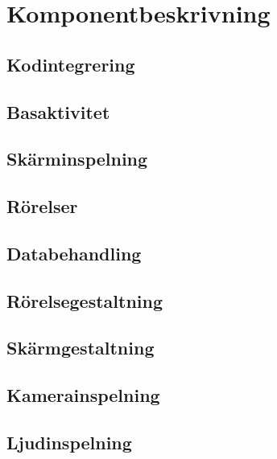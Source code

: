 \section{Komponentbeskrivning}

\subsection{Kodintegrering} %
\label{sub:Kodintegrering}


\subsection{Basaktivitet}


\subsection{Skärminspelning}


\subsection{Rörelser}


\subsection{Databehandling}
\label{sub:dataprocessing}


\subsection{Rörelsegestaltning}
\label{sub:touchmedia}


\subsection{Skärmgestaltning}
\label{sub:screenmedia}


\subsection{Kamerainspelning}


\subsection{Ljudinspelning}


